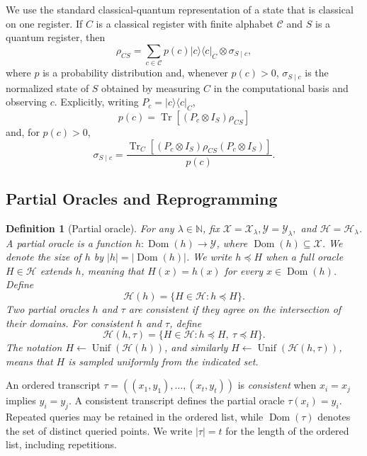 \documentclass[11pt]{article}
\newtheorem{definition}[definition]{Definition}
\newcommand{\cH}{\mathcal{H}}
\newcommand{\cX}{\mathcal{X}}
\newcommand{\cY}{\mathcal{Y}}
\newcommand{\Dom}{\operatorname{Dom}}
\newcommand{\Unif}{\operatorname{Unif}}
\newcommand{\Tr}{\operatorname{Tr}}
\newcommand{\ket}[1]{\lvert #1\rangle}
\newcommand{\bra}[1]{\langle #1\rvert}
\newcommand{\proj}[1]{\ket{#1}\!\bra{#1}}
\begin{document}
We use the standard classical-quantum representation of a state that is
classical on one register. If \(C\)
is a classical register with finite alphabet \(\mathcal C\) and \(S\) is a
quantum register, then
\[
  \rho_{CS}
  =
  \sum_{c\in\mathcal C}
  p(c)\proj{c}_C\otimes\sigma_{S\mid c},
\]
where \(p\) is a probability distribution and, whenever \(p(c)>0\),
\(\sigma_{S\mid c}\) is the normalized state of \(S\) obtained by measuring
\(C\) in the computational basis and observing \(c\). Explicitly, writing
\(P_c=\proj{c}_C\),
\[
  p(c)=\Tr\!\left[(P_c\otimes I_S)\rho_{CS}\right]
\]
and, for \(p(c)>0\),
\[
  \sigma_{S\mid c}
  =
  \frac{
    \Tr_C\!\left[(P_c\otimes I_S)\rho_{CS}(P_c\otimes I_S)\right]
  }{p(c)}.
\]

\subsection{Partial Oracles and Reprogramming}

\begin{definition}[Partial oracle]
For any $\lambda \in \mathbb{N}$, fix $\cX = \cX_\lambda, \cY = \cY_\lambda,$ and $\cH = \cH_\lambda$.  A partial oracle is a function
\(h:\Dom(h)\to\cY\), where
\(\Dom(h)\subseteq\cX\). We denote the \emph{size} of $h$ by \(|h|=|\Dom(h)|\). We write
\(h\preceq H\) when a full oracle \(H\in\cH\) extends \(h\), meaning that
\(H(x)=h(x)\) for every \(x\in\Dom(h)\).  Define
\[
  \cH(h)=\{H\in\cH:h\preceq H\}.
\]
Two partial oracles \(h\) and \(\tau\) are \emph{consistent} if they agree on the
intersection of their domains.  For consistent \(h\) and \(\tau\), define
\[
  \cH(h,\tau)
  =
  \{H\in\cH:h\preceq H,\ \tau\preceq H\}.
\]
The notation \(H\leftarrow\Unif(\cH(h))\), and similarly
\(H\leftarrow\Unif(\cH(h,\tau))\), means that \(H\) is sampled uniformly
from the indicated set.
\end{definition}

An ordered transcript
\(\tau=((x_1,y_1),\ldots,(x_t,y_t))\) is \emph{consistent} when
\(x_i=x_j\) implies \(y_i=y_j\).  A consistent transcript defines the
partial oracle \(\tau(x_i)=y_i\).  Repeated queries may be retained in the
ordered list, while \(\Dom(\tau)\) denotes the set of distinct queried
points.  We write \(|\tau|=t\) for the length of the ordered list, including
repetitions.
\end{document}

